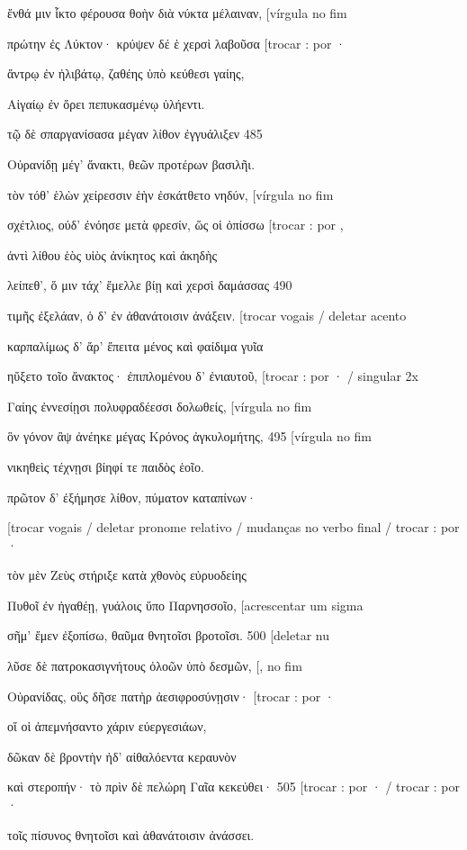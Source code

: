 ἔνθά μιν ἷκτο φέρουσα θοὴν διὰ νύκτα μέλαιναν, {[}vírgula no fim

πρώτην ἐς Λύκτον· κρύψεν δέ ἑ χερσὶ λαβοῦσα {[}trocar : por ·

ἄντρῳ ἐν ἠλιβάτῳ, ζαθέης ὑπὸ κεύθεσι γαίης,

Αἰγαίῳ ἐν ὄρει πεπυκασμένῳ ὑλήεντι.

τῷ δὲ σπαργανίσασα μέγαν λίθον ἐγγυάλιξεν 485

Οὐρανίδῃ μέγ' ἄνακτι, θεῶν προτέρων βασιλῆι.

τὸν τόθ' ἑλὼν χείρεσσιν ἑὴν ἐσκάτθετο νηδύν, {[}vírgula no fim

σχέτλιος, οὐδ' ἐνόησε μετὰ φρεσίν, ὥς οἱ ὀπίσσω {[}trocar : por ,

ἀντὶ λίθου ἑὸς υἱὸς ἀνίκητος καὶ ἀκηδὴς

λείπεθ', ὅ μιν τάχ' ἔμελλε βίῃ καὶ χερσὶ δαμάσσας 490

τιμῆς ἐξελάαν, ὁ δ' ἐν ἀθανάτοισιν ἀνάξειν. {[}trocar vogais / deletar
acento

καρπαλίμως δ' ἄρ' ἔπειτα μένος καὶ φαίδιμα γυῖα

ηὔξετο τοῖο ἄνακτος· ἐπιπλομένου δ' ἐνιαυτοῦ, {[}trocar : por · /
singular 2x

Γαίης ἐννεσίῃσι πολυφραδέεσσι δολωθείς, {[}vírgula no fim

ὃν γόνον ἂψ ἀνέηκε μέγας Κρόνος ἀγκυλομήτης, 495 {[}vírgula no fim

νικηθεὶς τέχνῃσι βίηφί τε παιδὸς ἑοῖο.

πρῶτον δ' ἐξήμησε λίθον, πύματον καταπίνων·

{[}trocar vogais / deletar pronome relativo / mudanças no verbo final /
trocar : por ·

τὸν μὲν Ζεὺς στήριξε κατὰ χθονὸς εὐρυοδείης

Πυθοῖ ἐν ἠγαθέῃ, γυάλοις ὕπο Παρνησσοῖο, {[}acrescentar um sigma

σῆμ' ἔμεν ἐξοπίσω, θαῦμα θνητοῖσι βροτοῖσι. 500 {[}deletar nu

λῦσε δὲ πατροκασιγνήτους ὀλοῶν ὑπὸ δεσμῶν, {[}, no fim

Οὐρανίδας, οὓς δῆσε πατὴρ ἀεσιφροσύνῃσιν· {[}trocar : por ·

οἵ οἱ ἀπεμνήσαντο χάριν εὐεργεσιάων,

δῶκαν δὲ βροντὴν ἠδ' αἰθαλόεντα κεραυνὸν

καὶ στεροπήν· τὸ πρὶν δὲ πελώρη Γαῖα κεκεύθει· 505 {[}trocar : por · /
trocar : por ·

τοῖς πίσυνος θνητοῖσι καὶ ἀθανάτοισιν ἀνάσσει.

